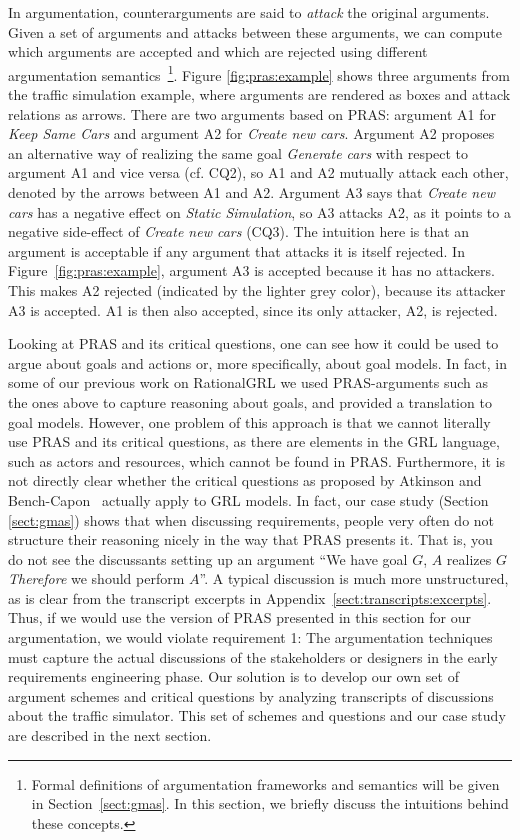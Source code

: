 In argumentation, counterarguments are said to \emph{attack} the original arguments. Given a set of arguments and attacks between these arguments, we can compute which arguments are accepted and which are rejected using different argumentation semantics~\cite{Dung1995}\footnote{Formal definitions of argumentation frameworks and semantics will be given in Section~\ref{sect:gmas}. In this section, we briefly discuss the intuitions behind these concepts.}. Figure \ref{fig:pras:example} shows three arguments from the traffic simulation example, where arguments are rendered as boxes and attack relations as arrows. There are two arguments based on PRAS: argument A1 for \emph{Keep Same Cars} and argument A2 for \emph{Create new cars}. Argument A2 proposes an alternative way of realizing the same goal \emph{Generate cars} with respect to argument A1 and vice versa (cf. CQ2), so A1 and A2 mutually attack each other, denoted by the arrows between A1 and A2. Argument A3 says that \emph{Create new cars} has a negative effect on \emph{Static Simulation}, so A3 attacks A2, as it points to a negative side-effect of \emph{Create new cars} (CQ3). The intuition here is that an argument is acceptable if any argument that attacks it is itself rejected. In Figure~\ref{fig:pras:example}, argument A3 is accepted because it has no attackers. This makes A2 rejected (indicated by the lighter grey color), because its attacker A3 is accepted. A1 is then also accepted, since its only attacker, A2, is rejected. 

Looking at PRAS and its critical questions, one can see how it could be used to argue about goals and actions or, more specifically, about goal models. In fact, in some of our previous work on RationalGRL \cite{vanzee-etal:renext2015,vanZee-etal:er2016} we used PRAS-arguments such as the ones above to capture reasoning about goals, and provided a translation to goal models. However, one problem of this approach is that we cannot literally use PRAS and its critical questions, as there are elements in the GRL language, such as actors and resources, which cannot be found in PRAS. Furthermore, it is not directly clear whether the critical questions as proposed by Atkinson and Bench-Capon~\cite{atkinson2007} actually apply to GRL models. In fact, our case study (Section \ref{sect:gmas}) shows that when discussing requirements, people very often do not structure their reasoning nicely in the way that PRAS presents it. That is, you do not see the discussants setting up an argument ``We have goal $G$, $A$ realizes $G$ \emph{Therefore} we should perform $A$''. A typical discussion is much more unstructured, as is clear from the transcript excerpts in Appendix~\ref{sect:transcripts:excerpts}. Thus, if we would use the version of PRAS presented in this section for our argumentation, we would violate requirement 1: The argumentation techniques must capture the actual discussions of the stakeholders or designers in the early requirements engineering phase. Our solution is to develop our own set of argument schemes and critical questions by analyzing transcripts of discussions about the traffic simulator. This set of schemes and questions and our case study are described in the next section. 

